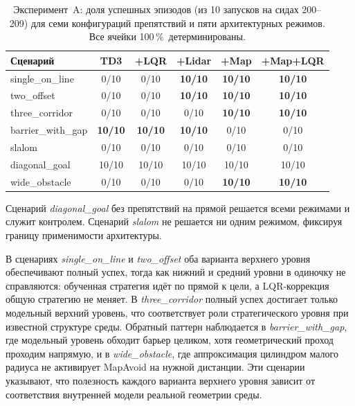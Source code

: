 \documentclass[11pt]{article}
\begin{document}
\begin{table}[h]
\begin{center}
\begin{tabular}{lccccc}
\toprule
Сценарий & TD3 & +LQR & +Lidar & +Map & +Map+LQR \\
\midrule
single\_on\_line     & 0/10 & 0/10 & \textbf{10/10} & \textbf{10/10} & \textbf{10/10} \\
two\_offset         & 0/10 & 0/10 & \textbf{10/10} & \textbf{10/10} & \textbf{10/10} \\
three\_corridor     & 0/10 & 0/10 & 0/10           & \textbf{10/10} & \textbf{10/10} \\
barrier\_with\_gap  & \textbf{10/10} & \textbf{10/10} & \textbf{10/10} & 0/10 & 0/10 \\
slalom              & 0/10 & 0/10 & 0/10 & 0/10           & 0/10           \\
diagonal\_goal      & 10/10 & 10/10 & 10/10 & 10/10        & 10/10         \\
wide\_obstacle      & 0/10 & 0/10 & 0/10 & \textbf{10/10} & \textbf{10/10} \\
\bottomrule
\end{tabular}
\caption{Эксперимент~A: доля успешных эпизодов (из 10 запусков на сидах
200--209) для семи конфигураций препятствий и пяти архитектурных режимов.
Все ячейки 100\,\%~детерминированы.}
\label{tab:exp_a}
\end{center}
\end{table}

Сценарий \emph{diagonal\_goal} без препятствий на прямой решается всеми режимами и служит контролем. Сценарий \emph{slalom} не решается ни одним режимом, фиксируя границу применимости архитектуры.

В сценариях \emph{single\_on\_line} и \emph{two\_offset} оба варианта верхнего уровня обеспечивают полный успех, тогда как нижний и средний уровни в одиночку не справляются: обученная стратегия идёт по прямой к цели, а LQR-коррекция общую стратегию не меняет. В \emph{three\_corridor} полный успех достигает только модельный верхний уровень, что соответствует роли стратегического уровня при известной структуре среды. Обратный паттерн наблюдается в \emph{barrier\_with\_gap}, где модельный уровень обходит барьер целиком, хотя геометрический проход проходим напрямую, и в \emph{wide\_obstacle}, где аппроксимация цилиндром малого радиуса не активирует MapAvoid на нужной дистанции. Эти сценарии указывают, что полезность каждого варианта верхнего уровня зависит от соответствия внутренней модели реальной геометрии среды.
\end{document}
